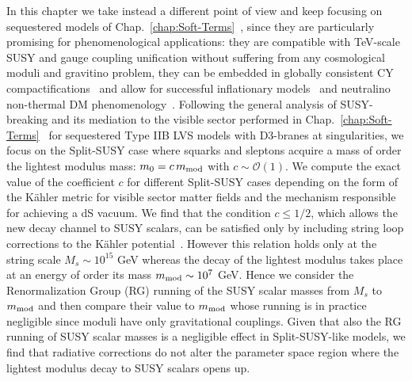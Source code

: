 \documentclass[12pt,a4paper]{book}
\newcommand{\mc}{\mathcal}
\begin{document}
In this chapter we take instead a different point of view and keep focusing on sequestered models of Chap.~\ref{chap:Soft-Terms}~\cite{Cicoli:2012aq, Higaki:2012ar}, since they are particularly promising for phenomenological applications: they are compatible with TeV-scale SUSY and gauge coupling unification without suffering from any cosmological moduli and gravitino problem, they can be embedded in globally consistent CY compactifications~\cite{Cicoli:2012vw, Cicoli:2013cha} and allow for successful inflationary models~\cite{Conlon:2005jm, Burgess:2013sla, Cicoli:2011zz} and neutralino non-thermal DM phenomenology~\cite{Aparicio:2015sda}. Following the general analysis of SUSY-breaking and its mediation to the visible sector performed in Chap.~\ref{chap:Soft-Terms}~\cite{Aparicio:2014wxa} for sequestered Type IIB LVS models with D3-branes at singularities, we focus on the Split-SUSY case where squarks and sleptons acquire a mass of order the lightest modulus mass: $m_0 = c\, m_{\rm mod}$ with $c\sim \mc{O}(1)$. We compute the exact value of the coefficient $c$ for different Split-SUSY cases depending on the form of the K\"ahler metric for visible sector matter fields and the mechanism responsible for achieving a dS vacuum. We find that the condition $c\leq 1/2$, which allows the new decay channel to SUSY scalars, can be satisfied only by including string loop corrections to the K\"ahler potential~\cite{Cicoli:2007xp, Berg:2007wt}. However this relation holds only at the string scale $M_s \sim 10^{15}$ GeV whereas the decay of the lightest modulus takes place at an energy of order its mass $m_{\rm mod}\sim 10^7$ GeV. Hence we consider the Renormalization Group (RG) running of the SUSY scalar masses from $M_s$ to $m_{\rm mod}$ and then compare their value to $m_{\rm mod}$ whose running is in practice negligible since moduli have only gravitational couplings. Given that also the RG running of SUSY scalar masses is a negligible effect in Split-SUSY-like models, we find that radiative corrections do not alter the parameter space region where the lightest modulus decay to SUSY scalars opens up.\\
\end{document}
